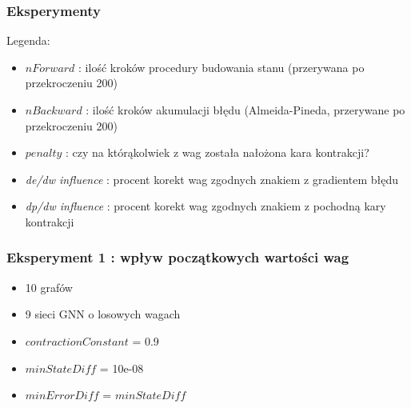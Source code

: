 \documentclass{beamer}
\begin{document}
\begin{frame}
\frametitle{Eksperymenty}
Legenda:
\begin{itemize}
	\item $nForward$ : ilość kroków procedury budowania stanu (przerywana po przekroczeniu 200)
	\item $nBackward$ : ilość kroków akumulacji błędu (Almeida-Pineda, przerywane po przekroczeniu 200)
	\item $penalty$ : czy na którąkolwiek z wag została nałożona kara kontrakcji?
	\item \emph{de/dw influence} : procent korekt wag zgodnych znakiem z gradientem błędu
	\item \emph{dp/dw influence} : procent korekt wag zgodnych znakiem z pochodną kary kontrakcji
\end{itemize}
\end{frame}

\begin{frame}
\frametitle{Eksperyment 1 : wpływ początkowych wartości wag}
\begin{itemize}
	\item 10 grafów
	\item 9 sieci GNN o losowych wagach
	\item $contractionConstant$ = 0.9
	\item $minStateDiff$ = 10e-08
	\item $minErrorDiff$ = $minStateDiff$
\end{itemize}
\end{frame}
\end{document}
